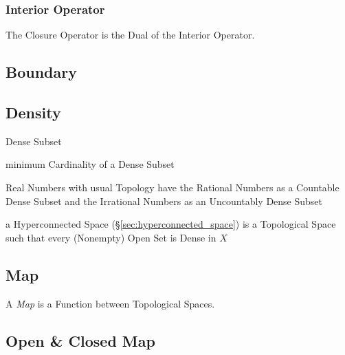 \subsubsection{Interior Operator}\label{sec:interior_operator}

The Closure Operator is the Dual of the Interior Operator.



\subsection{Boundary}\label{sec:boundary}

\subsection{Density}\label{sec:density}

Dense Subset

minimum Cardinality of a Dense Subset

Real Numbers with usual Topology have the Rational Numbers as a Countable Dense
Subset and the Irrational Numbers as an Uncountably Dense Subset

\fist a Hyperconnected Space (\S\ref{sec:hyperconnected_space}) is a
Topological Space such that every (Nonempty) Open Set is Dense in $X$



\subsection{Map}\label{sec:topology_map}

A \emph{Map} is a Function between Topological Spaces.



\subsection{Open \& Closed Map}\label{sec:open_closed_map}

